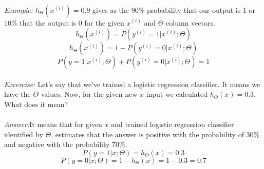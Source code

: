 \documentclass{article} %
\begin{document}
\\
\textit{Example:} $h_{\Theta}(x^{(i)}) = 0.9$ gives as the $90\%$ probability that our output is 1 or $10\%$ that the output is 0 for the given $x^{(i)}$ and $\Theta$ column vectors.\\
\begin{equation}
h_{\Theta}(x^{(i)}) = P( y^{(i)}=1 | x^{(i)};\Theta )
\end{equation}
\begin{equation}
h_{\Theta}(x^{(i)}) = 1 - P( y^{(i)}=0 | x^{(i)};\Theta )
\end{equation}
\begin{equation}
P( y=1 | x^{(i)};\Theta ) + P( y^{(i)}=0 | x^{(i)};\Theta ) = 1
\end{equation}
\\
\textit{Excercise:} Let's say that we've trained a logistic regression classifier. It means we have the $\Theta$ values. Now, for the given new $x$ input we calculated $h_{\Theta}(x) = 0.3$. What does it mean?\\
\\
\textit{Answer:}It means that for given $x$ and trained logistic regression classifier identified by $\Theta$, estimates that the answer is positive with the probability of 30\% and negative with the probability 70\%.    
\begin{equation*}
P( y=1 | x;\Theta ) = h_{\Theta}(x) = 0.3
\end{equation*}
\begin{equation*}
P( y=0 | x;\Theta ) = 1 - h_{\Theta}(x) = 1 - 0.3 = 0.7
\end{equation*}



\end{document}
